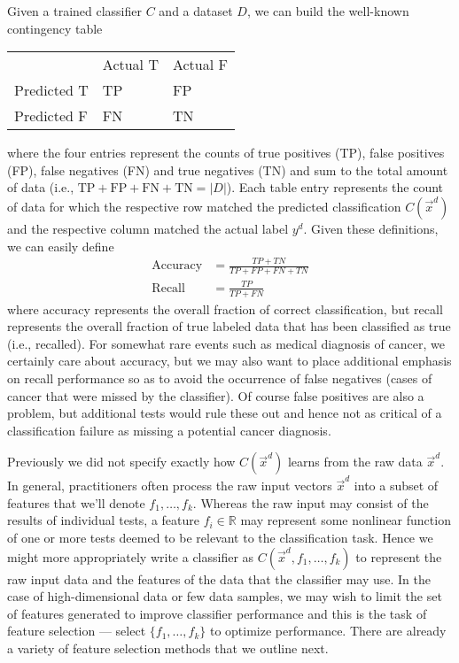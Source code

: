 Given a trained classifier $C$ and a dataset $D$, we can build the 
well-known contingency table
\begin{center}
\begin{tabular}{l|l|l|} 
\multicolumn{1}{l}{} &  \multicolumn{1}{l}{Actual T} & \multicolumn{1}{l}{Actual F} \\ \cline{2-3}
Predicted T & TP & FP \\ \cline{2-3}
Predicted F & FN & TN \\ \cline{2-3}
\end{tabular}
\end{center}
where the four entries represent the counts of true positives (TP), false positives (FP), false negatives (FN)
and true negatives (TN) and sum to the 
total amount of data (i.e., $\mathrm{TP} + \mathrm{FP} + \mathrm{FN} + \mathrm{TN} = |D|$).
Each table entry represents the count of data for which the respective row matched the 
predicted classification $C(\vec{x}^d)$ and the respective column matched the actual label $y^d$.
Given these definitions, we can easily define 
\begin{align*}
\textrm{Accuracy}  & = \frac{TP + TN}{TP + FP + FN + TN} \\
\textrm{Recall}    & = \frac{TP}{TP + FN}
\end{align*}
where accuracy represents the overall fraction of correct classification, but recall
represents the overall fraction of true labeled data that has been classified as
true (i.e., recalled).  For somewhat rare events such as medical diagnosis of cancer,
we certainly care about accuracy, but we may also want to place additional emphasis
on recall performance so as to avoid the occurrence of false negatives (cases of cancer
that were missed by the classifier).  Of course false positives are also a problem,
but additional tests would rule these out and hence not as critical of a classification
failure as missing a potential cancer diagnosis.

Previously we did not specify exactly how $C(\vec{x}^d)$ learns from the raw data
$\vec{x}^d$.  In general, practitioners often process the raw input vectors
$\vec{x}^d$ into a subset of features that we'll denote $f_1,\ldots,f_k$.  Whereas
the raw input may consist of the results of individual tests, a feature $f_i \in \mathbb{R}$
may represent some nonlinear function of one or more tests deemed to be relevant to
the classification task.  Hence we might more appropriately write a classifier
as $C(\vec{x}^d,f_1,\ldots,f_k)$ to represent the raw input data and the features
of the data that the classifier may use.
In the case of high-dimensional data or few data samples,
we may wish to limit the set of features generated to improve classifier performance
and this is the task of feature selection --- select $\{f_1,\ldots,f_k\}$ to optimize
performance.  There are already a variety of feature selection methods that we outline
next.



